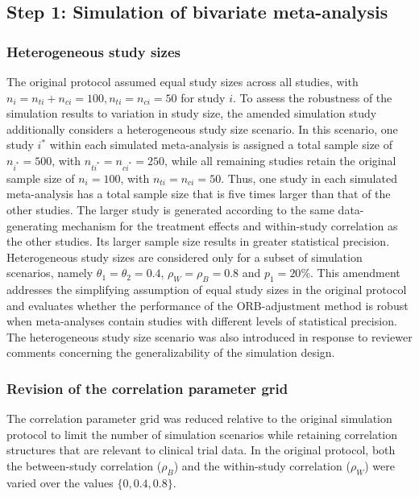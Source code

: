 \documentclass[11pt]{article}
\begin{document}
\subsection{Step 1: Simulation of bivariate meta-analysis}

\subsubsection{Heterogeneous study sizes}
The original protocol assumed equal study sizes across all studies, with $n_i=n_{ti}+n_{ci}=100, n_{ti}=n_{ci}=50$ for study $i$.
To assess the robustness of the simulation results to variation in study size, the amended simulation study additionally considers a heterogeneous study size scenario. In this scenario, one study $i^\ast$ within each simulated meta-analysis is assigned a total sample size of $n_{i^\ast}=500$,
with $n_{ti^\ast}=n_{ci^\ast}=250$, while all remaining studies retain the original sample size of $n_i=100$, with $n_{ti}=n_{ci}=50.$
Thus, one study in each simulated meta-analysis has a total sample size that is five times larger than that of the other studies. The larger study is generated according to the same data-generating mechanism for the treatment effects and within-study correlation as the other studies. Its larger sample size results in greater statistical precision. Heterogeneous study sizes are considered only for a subset of simulation scenarios, namely \ie $\theta_1 = \theta_2 = 0.4$, $\rho_W = \rho_B = 0.8$ and $p_1 = 20\%$.
This amendment addresses the simplifying assumption of equal study sizes in the original protocol and evaluates whether the performance of the ORB-adjustment method is robust when meta-analyses contain studies with different levels of statistical precision. The heterogeneous study size scenario was also introduced in response to reviewer comments concerning the generalizability of the simulation design.

\subsubsection{Revision of the correlation parameter grid}
The correlation parameter grid was reduced relative to the original simulation protocol to limit the number of simulation scenarios while retaining correlation structures that are relevant to clinical trial data. In the original protocol, both the between-study correlation ($\rho_B$) and the within-study correlation ($\rho_W$) were varied over the values $\{0, 0.4, 0.8\}$.
\end{document}
